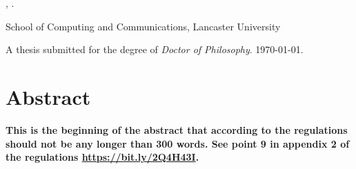 \begin{center}
\textbf{\thesistitle}

\authorname, \authordegrees.

School of Computing and Communications, Lancaster University

A thesis submitted for the degree of \textit{Doctor of Philosophy}. \monthyeardate\today.
\end{center}

\section*{\centering Abstract}

\textbf{This is the beginning of the abstract that according to the regulations should not be any longer than 300 words. See point 9 in appendix 2 of the regulations \url{https://bit.ly/2Q4H43I}.}